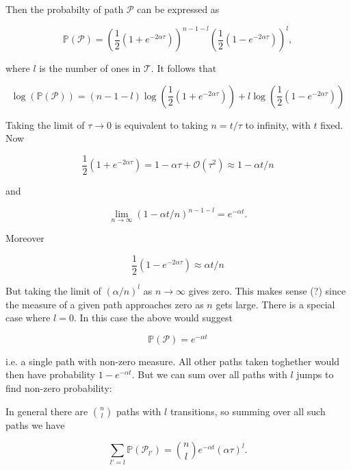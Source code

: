 \documentclass{article}
\newcommand{\bP}{\mathbb{P}}
\begin{document}
Then the probabilty of path $\mathcal{P}$ can be expressed as

\begin{equation} \bP(\mathcal{P}) = (\frac{1}{2}(1+e^{-2\alpha \tau}))^{n-1-l}(\frac{1}{2}(1-e^{-2\alpha \tau}))^l,
\end{equation}

where $l$ is the number of ones in $\mathcal{T}$. It follows that

\begin{equation}
  \log(\bP(\mathcal{P})) = (n-1-l) \log\left(\frac{1}{2}(1+e^{-2\alpha \tau})\right) + l \log\left(\frac{1}{2}(1-e^{-2\alpha \tau})\right)
\end{equation}

Taking the limit of $\tau \rightarrow 0$ is equivalent to taking $n = t/\tau$ to infinity, with $t$ fixed. Now

\begin{equation}\label{one_particle_path}
  \frac{1}{2}(1+e^{-2\alpha\tau}) = 1-\alpha \tau + \mathcal{O}(\tau^2) \approx 1-\alpha t/n
\end{equation}


and

\begin{equation}\label{transition_record}
  \lim_{n \rightarrow \infty} (1-\alpha t/n)^{n-1-l} = e^{-\alpha t}.
\end{equation}

Moreover

$$ \frac{1}{2}(1-e^{-2\alpha \tau}) \approx \alpha t/n$$

But taking the limit of $(\alpha/n)^l$ as $n \rightarrow \infty$ gives zero. This makes sense (?) since the measure of a given path approaches zero as $n$ gets large. There is a special case where $l = 0$. In this case the above would suggest

$$\bP(\mathcal{P}) = e^{-\alpha t}$$

i.e. a single path with non-zero measure. All other paths taken toghether would then have probability $1-e^{-\alpha t}$. But we can sum over all paths with $l$ jumps to find non-zero probability:

In general there are $n \choose l$ paths with $l$ transitions, so summing over all such paths  we have

\begin{equation}
  \sum_{l' = l}\bP(\mathcal{P}_{l'}) = {n \choose l} e^{-\alpha t}(\alpha \tau)^l.
\end{equation}
\end{document}
